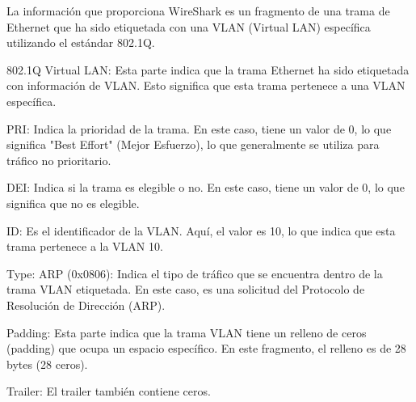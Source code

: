 \documentclass[a4paper]{article}
\begin{document}
\begin{enumerate}
	La información que proporciona WireShark es un fragmento de una trama de Ethernet que ha sido etiquetada con una VLAN (Virtual LAN) específica utilizando el estándar 802.1Q. 
	
	802.1Q Virtual LAN: Esta parte indica que la trama Ethernet ha sido etiquetada con información de VLAN. Esto significa que esta trama pertenece a una VLAN específica.
	
	PRI: Indica la prioridad de la trama. En este caso, tiene un valor de 0, lo que significa "Best Effort" (Mejor Esfuerzo), lo que generalmente se utiliza para tráfico no prioritario.
	
	DEI: Indica si la trama es elegible o no. En este caso, tiene un valor de 0, lo que significa que no es elegible.
	
	ID: Es el identificador de la VLAN. Aquí, el valor es 10, lo que indica que esta trama pertenece a la VLAN 10.
	
	Type: ARP (0x0806): Indica el tipo de tráfico que se encuentra dentro de la trama VLAN etiquetada. En este caso, es una solicitud del Protocolo de Resolución de Dirección (ARP).
	
	Padding: Esta parte indica que la trama VLAN tiene un relleno de ceros (padding) que ocupa un espacio específico. En este fragmento, el relleno es de 28 bytes (28 ceros).
	
	Trailer: El trailer también contiene ceros.
	

\end{enumerate}
\end{document}
